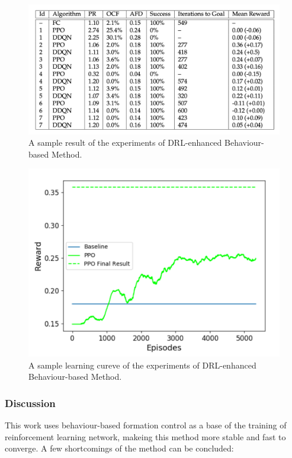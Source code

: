 \begin{figure}
	\centering
	\includegraphics[width=5in]{drlbbexperimentresult.png}
	\caption{A sample result of the experiments of DRL-enhanced Behaviour-based Method.}
	\label{fig:drlbbexperimentresult} 
\end{figure}

\begin{figure}
	\centering
	\includegraphics[width=5in]{drlbblearningcurve.png}
	\caption{A sample learning cureve of the experiments of DRL-enhanced Behaviour-based Method.}
	\label{fig:drlbblearningcurve} 
\end{figure}

\subsubsection{Discussion}

This work uses behaviour-based formation control as a base of the training of reinforcement learning network, makeing this method more stable and fast to converge.
A few shortcomings of the method can be concluded:

